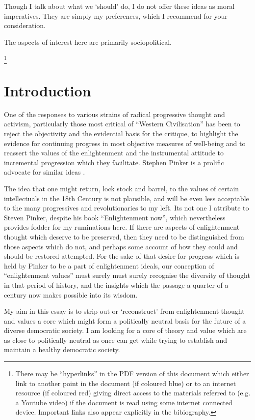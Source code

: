 \documentclass[10pt,titlepage]{article}
\begin{document}
Though I talk about what we `should' do, I do not offer these ideas as moral imperatives.
They are simply my preferences, which I recommend for your consideration.


The aspects of interest here are primarily sociopolitical.


\footnote{There may be ``hyperlinks'' in the PDF version of this document which either link to another point in the document  (if coloured blue) or to an internet resource  (if coloured red) giving direct access to the materials referred to (e.g. a Youtube video) if the document is read using some internet connected device.
Important links also appear explicitly in the bibiography.}

\pagebreak
\section{Introduction}

One of the responses to various strains of radical progressive thought and activism, particularly those most critical of ``Western Civilisation'' has been to reject the objectivity and the evidential basis for the critique, to highlight the evidence for continuing progress in most objective measures of well-being and to reassert the values of the enlightenment and the instrumental attitude to incremental progression which they facilitate.
Stephen Pinker is a prolific advocate for similar ideas \cite{pinker-angels,pinker-en}.

The idea that one might return, lock stock and barrel, to the values of certain intellectuals in the 18th Century is not plausible, and will be even less acceptable to the many progressives and revolutionaries to my left.
Its not one I attribute to Steven Pinker, despite his book ``Enlightenment now''\cite{pinker-en}, which nevertheless provides fodder for my ruminations here.
If there are aspects of enlightenment thought which deserve to be preserved, then they need to be distinguished from those aspects which do not, and perhaps some account of how they could and should be restored attempted.
For the sake of that desire for progress which is held by Pinker to be a part of enlightenment ideals, our conception of ``enlightenment values'' must surely must surely recognise the diversity of thought in that period of history, and the insights which the passage a quarter of a century now makes possible into its wisdom.

My aim in this essay is to strip out or `reconstruct' from enlightenment thought and values a core which might form a politically neutral basis for the future of a diverse democratic society.
I am looking for a core of theory and value which are as close to politically neutral as once can get while trying to establish and maintain a healthy democratic society.
\end{document}
